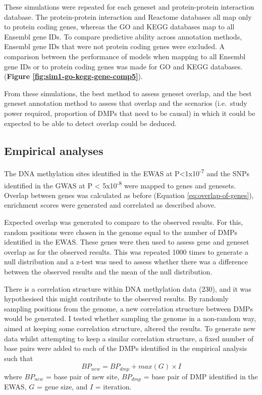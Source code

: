 \documentclass[11pt,twoside]{bristolthesis}
\begin{document}
These simulations were repeated for each geneset and protein-protein interaction database. The protein-protein interaction and Reactome databases all map only to protein coding genes, whereas the GO and KEGG databases map to all Ensembl gene IDs. To compare predictive ability across annotation methods, Ensembl gene IDs that were not protein coding genes were excluded. A comparison between the performance of models when mapping to all Ensembl gene IDs or to protein coding genes was made for GO and KEGG databases. (\textbf{Figure \ref{fig:sim1-go-kegg-gene-comp5}}).

From these simulations, the best method to assess geneset overlap, and the best geneset annotation method to assess that overlap and the scenarios (i.e.~study power required, proportion of DMPs that need to be causal) in which it could be expected to be able to detect overlap could be deduced.

\hypertarget{empirical-analyses}{%
\subsection{Empirical analyses}\label{empirical-analyses}}

The DNA methylation sites identified in the EWAS at P\textless1x10\textsuperscript{-7} and the SNPs identified in the GWAS at P \textless{} 5x10\textsuperscript{-8} were mapped to genes and genesets. Overlap between genes was calculated as before (Equation \eqref{eq:overlap-of-genes}), enrichment scores were generated and correlated as described above.

Expected overlap was generated to compare to the observed results. For this, random positions were chosen in the genome equal to the number of DMPs identified in the EWAS. These genes were then used to assess gene and geneset overlap as for the observed results. This was repeated 1000 times to generate a null distribution and a z-test was used to assess whether there was a difference between the observed results and the mean of the null distribution.

There is a correlation structure within DNA methylation data (230), and it was hypothesised this might contribute to the observed results. By randomly sampling positions from the genome, a new correlation structure between DMPs would be generated. I tested whether sampling the genome in a non-random way, aimed at keeping some correlation structure, altered the results. To generate new data whilst attempting to keep a similar correlation structure, a fixed number of base pairs were added to each of the DMPs identified in the empirical analysis such that
\begin{equation}
    BP_{new} = BP_{dmp} + max(G) \times I
    \label{eq:generating-new-positions}
\end{equation}
where \(BP_{new}\) = base pair of new site, \(BP_{dmp}\) = base pair of DMP identified in the EWAS, \(G\) = gene size, and \(I\) = iteration.
\end{document}
